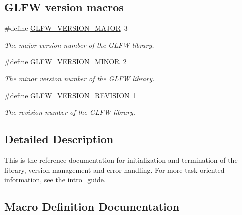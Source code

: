 \subsection*{G\+L\+FW version macros}
\begin{DoxyCompactItemize}
\item 
\#define \hyperlink{group__init_ga6337d9ea43b22fc529b2bba066b4a576}{G\+L\+F\+W\+\_\+\+V\+E\+R\+S\+I\+O\+N\+\_\+\+M\+A\+J\+OR}~3
\begin{DoxyCompactList}\small\item\em The major version number of the G\+L\+FW library. \end{DoxyCompactList}\item 
\#define \hyperlink{group__init_gaf80d40f0aea7088ff337606e9c48f7a3}{G\+L\+F\+W\+\_\+\+V\+E\+R\+S\+I\+O\+N\+\_\+\+M\+I\+N\+OR}~2
\begin{DoxyCompactList}\small\item\em The minor version number of the G\+L\+FW library. \end{DoxyCompactList}\item 
\#define \hyperlink{group__init_gab72ae2e2035d9ea461abc3495eac0502}{G\+L\+F\+W\+\_\+\+V\+E\+R\+S\+I\+O\+N\+\_\+\+R\+E\+V\+I\+S\+I\+ON}~1
\begin{DoxyCompactList}\small\item\em The revision number of the G\+L\+FW library. \end{DoxyCompactList}\end{DoxyCompactItemize}


\subsection{Detailed Description}
This is the reference documentation for initialization and termination of the library, version management and error handling. For more task-\/oriented information, see the intro\+\_\+guide. 

\subsection{Macro Definition Documentation}
\mbox{\label{group__init_ga6337d9ea43b22fc529b2bba066b4a576}} 
